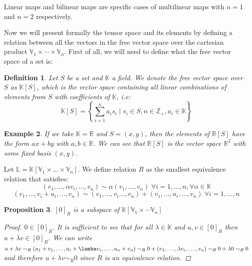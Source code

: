 \documentclass[11pt,a4paper,openright,oneside]{book}
\numberwithin{equation}{section}
\newtheorem{defn0}{Definition}[chapter]
\newtheorem{prop0}[defn0]{Proposition}
\newtheorem{example0}[defn0]{Example}
\newenvironment{definition}{ \begin{defn0}}{\end{defn0}}
\newenvironment{proposition}{\bigskip \begin{prop0}}{\end{prop0}}
\newenvironment{example}{ \begin{example0}\rm}{\end{example0}}
\begin{document}
Linear maps and bilinear maps are specific cases of multilinear maps with $n=1$ and $n=2$ respectively.

Now we will present formally the tensor space and its elements by defining a relation between all the vectors in the free vector space over the cartesian product
$\mathbb{V}_1 \times \cdots \times \mathbb{V}_n$. First of all, we will need to define what the free vector space of a set is:

\begin{definition} Let $S$ be a set and $\mathbb{K}$ a field. We denote the free vector space over $S$ as $\mathbb{K}[S]$, which
    is the vector space containing all linear combinations of elements from $S$ with coefficients of $\mathbb{K}$, i.e:
    $$\mathbb{K}[S] = \left\{ \sum_{i=1}^n a_i s_i \mid s_i \in S, n \in \mathbb{Z}_+, a_i \in \mathbb{K}  \right\}$$
\end{definition}

\begin{example} If we take $\mathbb{K} = \mathbb{R}$ and $S = (x,y)$, then the elements of $\mathbb{R}[S]$ have the form $ax + by$ with $a, b \in \mathbb{R}$.
We can see that $\mathbb{R}[S]$ is the vector space $\mathbb{R}^2$ with some fixed basis $(x, y)$.
\end{example}

Let $\mathbb{L} = \mathbb{K}[\mathbb{V}_1 \times \dots \times \mathbb{V}_n]$.
    We define relation $R$ as the smallest equivalence relation that satisfies: 
    $$(v_1, \dots, \alpha v_i, \dots, v_n) \sim \alpha(v_1, \dots, v_n) \; \forall i = 1, \dots, n, \forall \alpha \in \mathbb{K}$$
    $$(v_1, \dots, v_i + u_i, \dots, v_n) \sim (v_1, \dots, v_i \dots, v_n) + (v_1, \dots, u_i, \dots, v_n) \; \forall i = 1, \dots, n$$

\begin{proposition}
    $[0]_R$ is a subspace of $\mathbb{K} \left[ \mathbb{V}_1 \times \cdots \mathbb{V}_n \right]$

    \begin{proof}
        $0 \in [0]_R$. It is sufficient to see that for all $\lambda \in \mathbb{K}$ and $u, v \in [0]_R$ then $u + \lambda v \in [0]_R$.
        We can write $u + \lambda v \sim_R (u_1 + v_1, \dots, u_i + \lamba v_i, \dots, u_n + v_n) \sim_R 0 + (v_1, \dots, \lambda v_i, \dots, v_n) \sim_R 0 + \lambda 0 \sim_R 0$ and therefore
        $u + \lambda v \sim_R 0$ since $R$ is an equivalence relation.
    \end{proof}
\end{proposition}
\end{document}
